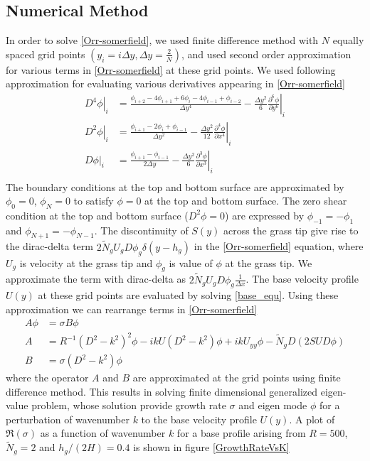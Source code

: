 \documentclass[12pt]{report}   %
\newcommand{\del}{\partial}
\newcommand{\Rey}{{R}}
\newcommand{\Ndg}{\tilde{N}_g}
\begin{document}
\subsection{Numerical Method}
  In order to solve \eqref{Orr-somerfield}, we used finite difference method with $N$ equally spaced grid points $(y_i = i\Delta y, \Delta y = \frac{2}{N})$, and used second order approximation for various terms in \eqref{Orr-somerfield} at these grid points. We used following approximation for evaluating various derivatives appearing in \eqref{Orr-somerfield}
  \begin{equation}
  \begin{align}
    \left.{ D^4\phi} \right|_i &= \frac{ \phi_{i+2}-4\phi_{i+1}+6\phi_{i}-4\phi_{i-1}+\phi_{i-2} }{\Delta y^4} - \frac{\Delta y^2}{6} \left. \frac{\del^6 \phi}{\del y^6} \right |_i \\
    \left. D^2\phi \right|_i &=  \frac{\phi_{i+1} -2\phi_i +\phi_{i-1}}{\Delta y^2} - \left. \frac{\Delta y^2}{12} \frac{\del^4 \phi}{\del x^4} \right|_i \\    
    \left. D\phi \right|_i &=  \frac{\phi_{i+1} -\phi_{i-1}}{2\Delta y} - \left. \frac{\Delta y^2}{6} \frac{\del^3 \phi}{\del x^3} \right|_i \\
    \end{align}
  \end{equation}
The boundary conditions at the top and bottom surface are approximated by $\phi_0 = 0$,  $\phi_{N} = 0$ to satisfy $\phi=0$ at the top and bottom surface.
The zero shear condition at the top and bottom surface ($D^2\phi=0$) are expressed by $\phi_{-1} = -\phi_{1}$ and $\phi_{N+1} = -\phi_{N-1}$. The discontinuity of $S(y)$ across the grass tip give rise to the dirac-delta term $2\Ndg U_g D\phi_g \delta(y-h_g)$ in the \ref{Orr-somerfield} equation, where $U_g$ is velocity at the grass tip and $\phi_g$ is value of $\phi$ at the grass tip. We approximate the term with dirac-delta as $2\Ndg U_g D\phi_{g} \frac{1}{\Delta x}$.
The base velocity profile $U(y)$ at these grid points are evaluated by solving \eqref{base_equ}. Using these approximation we can rearrange terms in \eqref{Orr-somerfield} 
\begin{equation}
\begin{split}
A\phi &= \sigma B \phi\\
A &= \Rey^{-1}\left(D^2 -k^{2} \right)^2\phi-ikU \left(D^2-k^2\right)\phi + ik U_{yy}\phi -\Ndg D\left(2 S U D \phi\right)\\
B &= {\sigma} \left(D^2-k^2\right) \phi
\end{split}
\end{equation}
where the operator $A$ and $B$ are approximated at the grid points using finite difference method. This results in solving finite dimensional generalized eigen-value problem, whose solution provide growth rate $\sigma$ and eigen mode $\phi$ for a perturbation of wavenumber $k$ to the base velocity profile $U(y)$. A plot of $\Re(\sigma)$ as a function of wavenumber $k$ for a base profile arising from $R=500$, $\Ndg=2$ and $h_g/(2H)=0.4$ is shown in figure \ref{GrowthRateVsK} 
\end{document}
